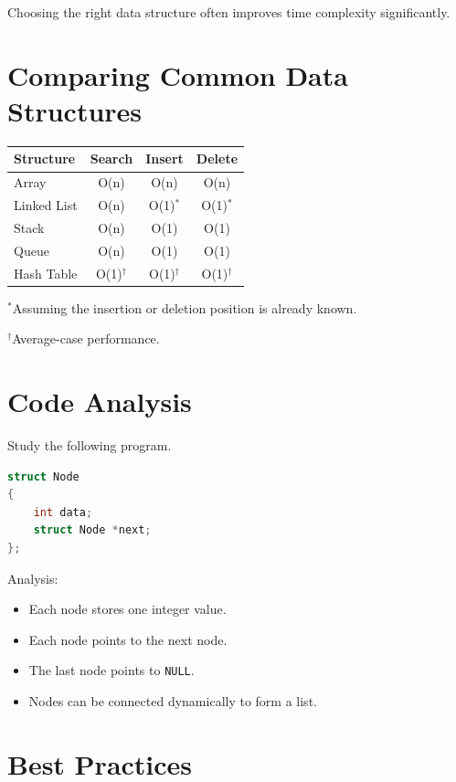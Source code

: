 \documentclass[12pt,openany]{book}
\begin{document}
Choosing the right data structure often improves time complexity significantly.

\section{Comparing Common Data Structures}

\begin{center}
\begin{tabular}{|l|c|c|c|}
\hline
Structure & Search & Insert & Delete \\
\hline
Array & O(n) & O(n) & O(n) \\
Linked List & O(n) & O(1)$^\ast$ & O(1)$^\ast$ \\
Stack & O(n) & O(1) & O(1) \\
Queue & O(n) & O(1) & O(1) \\
Hash Table & O(1)$^\dagger$ & O(1)$^\dagger$ & O(1)$^\dagger$ \\
\hline
\end{tabular}
\end{center}

{\small
$^\ast$Assuming the insertion or deletion position is already known.

$^\dagger$Average-case performance.
}

\section{Code Analysis}

Study the following program.

\begin{lstlisting}[language=C]
struct Node
{
    int data;
    struct Node *next;
};
\end{lstlisting}

Analysis:

\begin{itemize}
    \item Each node stores one integer value.
    \item Each node points to the next node.
    \item The last node points to \texttt{NULL}.
    \item Nodes can be connected dynamically to form a list.
\end{itemize}

\section{Best Practices}
\end{document}
